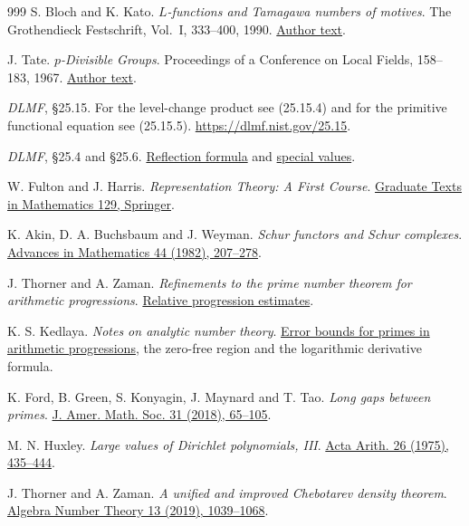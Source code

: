 \documentclass[11pt]{article}
\theoremstyle{definition}
\theoremstyle{plain}
\begin{document}
\begin{thebibliography}{999}
S. Bloch and K. Kato.
\emph{\(L\)-functions and Tamagawa numbers of motives}.
The Grothendieck Festschrift, Vol.~I, 333--400, 1990.
\href{https://virtualmath1.stanford.edu/~conrad/BSDseminar/refs/BKTamagawa.pdf}{Author text}.

J. Tate. \emph{\(p\)-Divisible Groups}.
Proceedings of a Conference on Local Fields, 158--183, 1967.
\href{https://www.math.purdue.edu/~tongliu/teaching/598/p-divisible.pdf}{Author text}.

\emph{DLMF}, \S25.15. For the level-change product see (25.15.4)
and for the primitive functional equation see (25.15.5).
\url{https://dlmf.nist.gov/25.15}.

\emph{DLMF}, \S25.4 and \S25.6.
\href{https://dlmf.nist.gov/25.4}{Reflection formula} and
\href{https://dlmf.nist.gov/25.6}{special values}.

W. Fulton and J. Harris.
\emph{Representation Theory: A First Course}.
\href{https://doi.org/10.1007/978-1-4612-0979-9}{Graduate Texts in Mathematics 129, Springer}.

K. Akin, D. A. Buchsbaum and J. Weyman.
\emph{Schur functors and Schur complexes}.
\href{https://doi.org/10.1016/0001-8708(82)90039-1}{Advances in Mathematics 44 (1982), 207--278}.

J. Thorner and A. Zaman.
\emph{Refinements to the prime number theorem for arithmetic progressions}.
\href{https://arxiv.org/abs/2108.10878}{Relative progression estimates}.

K. S. Kedlaya. \emph{Notes on analytic number theory}.
\href{https://kskedlaya.org/ant/chap-errorbounds2.html}{Error bounds for primes in arithmetic progressions},
the zero-free region and the logarithmic derivative formula.

K. Ford, B. Green, S. Konyagin, J. Maynard and T. Tao.
\emph{Long gaps between primes}.
\href{https://doi.org/10.1090/jams/876}{J. Amer. Math. Soc. 31 (2018), 65--105}.

M. N. Huxley. \emph{Large values of Dirichlet polynomials, III}.
\href{https://doi.org/10.4064/aa-26-4-435-444}{Acta Arith. 26 (1975), 435--444}.

J. Thorner and A. Zaman.
\emph{A unified and improved Chebotarev density theorem}.
\href{https://msp.org/ant/2019/13-5/ant-v13-n5-p02-p.pdf}{Algebra Number Theory 13 (2019), 1039--1068}.


\end{thebibliography}
\end{document}
